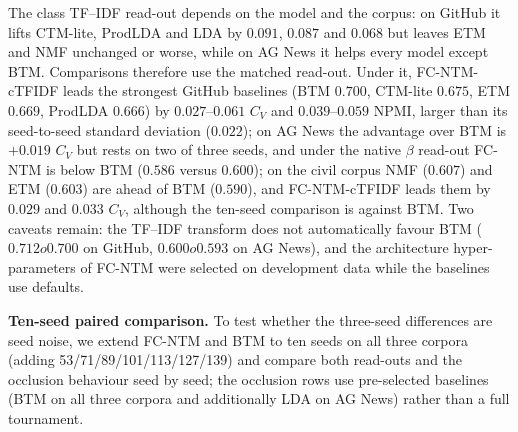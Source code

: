 \documentclass[Journal,letterpaper,NoLists]{ascelike-new}
\begin{document}
The class TF--IDF read-out depends on the model and the corpus: on GitHub it lifts CTM-lite,
ProdLDA and LDA by $0.091$, $0.087$ and $0.068$ but leaves ETM and NMF unchanged or worse, while on
AG News it helps every model except BTM. Comparisons therefore use the matched read-out. Under it,
FC-NTM-cTFIDF leads the strongest GitHub baselines (BTM $0.700$, CTM-lite $0.675$, ETM $0.669$,
ProdLDA $0.666$) by $0.027$--$0.061$ $C_V$ and $0.039$--$0.059$ NPMI, larger than its seed-to-seed
standard deviation ($0.022$); on AG News the advantage over BTM is $+0.019$ $C_V$ but rests on two
of three seeds, and under the native $\beta$ read-out FC-NTM is below BTM ($0.586$ versus
$0.600$); on the civil corpus NMF ($0.607$) and ETM ($0.603$) are ahead of BTM ($0.590$), and
FC-NTM-cTFIDF leads them by $0.029$ and $0.033$ $C_V$, although the ten-seed comparison is
against BTM. Two caveats remain: the TF--IDF transform does not automatically favour BTM
($0.712	o0.700$ on GitHub, $0.600	o0.593$ on AG News), and the architecture hyper-parameters
of FC-NTM were selected on development data while the baselines use defaults.

\noindent\textbf{Ten-seed paired comparison.} To test whether the three-seed differences are seed noise, we extend FC-NTM and BTM to ten seeds
on all three corpora (adding 53/71/89/101/113/127/139) and compare both read-outs and the
occlusion behaviour seed by seed; the occlusion rows use pre-selected baselines (BTM on all three
corpora and additionally LDA on AG News) rather than a full tournament.
\end{document}
